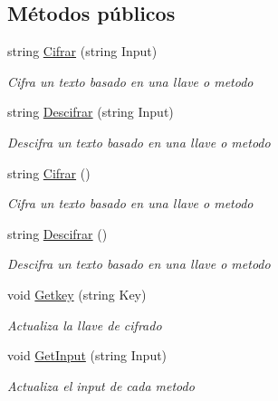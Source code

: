 \subsection*{Métodos públicos}
\begin{DoxyCompactItemize}
\item 
string \hyperlink{interface_cifrado_1_1_interface_cifrado_a67baf37475e65a3cf07a0546309cf391}{Cifrar} (string Input)
\begin{DoxyCompactList}\small\item\em Cifra un texto basado en una llave o metodo \end{DoxyCompactList}\item 
string \hyperlink{interface_cifrado_1_1_interface_cifrado_af7035203a5d4212ddcca039351dd3a22}{Descifrar} (string Input)
\begin{DoxyCompactList}\small\item\em Descifra un texto basado en una llave o metodo \end{DoxyCompactList}\item 
string \hyperlink{interface_cifrado_1_1_interface_cifrado_ade6b2a14d9cd48feec78c2695a2149bc}{Cifrar} ()
\begin{DoxyCompactList}\small\item\em Cifra un texto basado en una llave o metodo \end{DoxyCompactList}\item 
string \hyperlink{interface_cifrado_1_1_interface_cifrado_aef07884028ee90698a4a1202d851fecf}{Descifrar} ()
\begin{DoxyCompactList}\small\item\em Descifra un texto basado en una llave o metodo \end{DoxyCompactList}\item 
void \hyperlink{interface_cifrado_1_1_interface_cifrado_a0eee6d795ffd5d8f9971e1d8fb6f4b8d}{Getkey} (string Key)
\begin{DoxyCompactList}\small\item\em Actualiza la llave de cifrado \end{DoxyCompactList}\item 
void \hyperlink{interface_cifrado_1_1_interface_cifrado_ab573118c8f88269038b21e452a9fa8d3}{Get\+Input} (string Input)
\begin{DoxyCompactList}\small\item\em Actualiza el input de cada metodo \end{DoxyCompactList}\end{DoxyCompactItemize}


